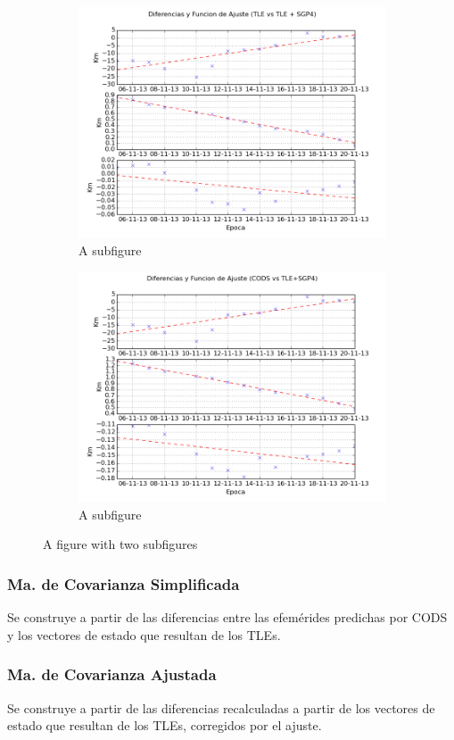 \begin{figure}[H]
 \centering
\begin{subfigure}%
  \centering
  \includegraphics[width=0.7\linewidth]{imagenes/graf_2013pw.png}
  \caption{A subfigure}
  \label{fig:sub1}
\end{subfigure}%
\begin{subfigure}%
  \centering
  \includegraphics[width=0.7\linewidth]{imagenes/graf_codsOsweiler.png}
  \caption{A subfigure}
  \label{fig:sub2}
\end{subfigure}
\caption{A figure with two subfigures}
\label{fig:test}
\end{figure}



\subsubsection{Ma. de Covarianza Simplificada}
Se construye a partir de las diferencias entre las efem\'erides predichas por CODS y los vectores de estado que resultan de los TLEs.\\


\subsubsection{Ma. de Covarianza Ajustada}
Se construye a partir de las diferencias recalculadas a partir de los vectores de estado que resultan de los TLEs, corregidos por el ajuste.\\


